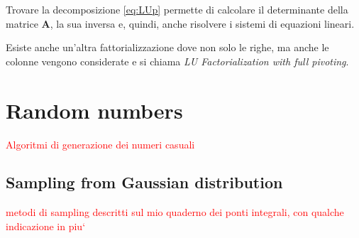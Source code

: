\documentclass[10pt]{article}
\begin{document}
Trovare la decomposizione \eqref{eq:LUp} permette di calcolare il determinante della matrice $\mathbf{A}$, la sua inversa e, quindi, anche risolvere i sistemi di equazioni lineari.

Esiste anche un'altra fattorializzazione dove non solo le righe, ma anche le colonne vengono considerate e si chiama \emph{LU Factorialization with full pivoting}.

















\newpage

\appendix

\section{Random numbers}

\textcolor{red}{Algoritmi di generazione dei numeri casuali}

\subsection{Sampling from Gaussian distribution}

\textcolor{red}{metodi di sampling descritti sul mio quaderno dei ponti integrali, con qualche indicazione in piu`}
\end{document}
